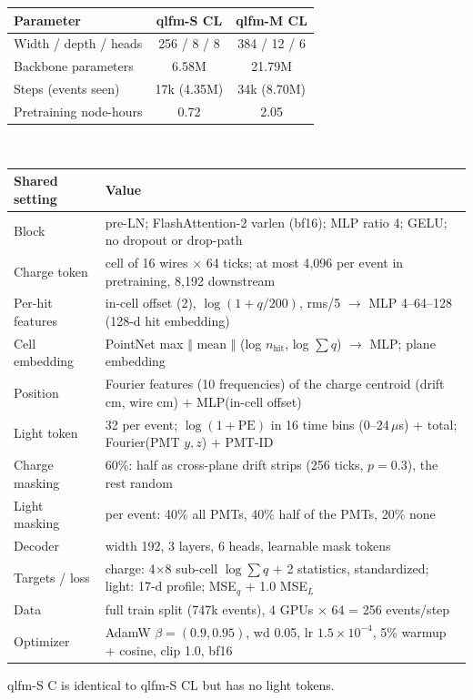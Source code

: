 \documentclass[11pt,a4paper]{article}
\begin{document}
\begin{center}\small
\begin{tabular}{lcc}
\toprule
Parameter & qlfm-S CL & qlfm-M CL\\
\midrule
Width / depth / heads & 256 / 8 / 8 & 384 / 12 / 6\\
Backbone parameters & 6.58M & 21.79M\\
Steps (events seen) & 17k (4.35M) & 34k (8.70M)\\
Pretraining node-hours & 0.72 & 2.05\\
\bottomrule
\end{tabular}\\[6pt]
\begin{tabularx}{\textwidth}{lL}
\toprule
Shared setting & Value\\
\midrule
Block & pre-LN; FlashAttention-2 varlen (bf16); MLP ratio 4; GELU; no dropout or drop-path\\
Charge token & cell of 16 wires $\times$ 64 ticks; at most 4{,}096 per event in pretraining, 8{,}192 downstream\\
Per-hit features & in-cell offset (2), $\log(1+q/200)$, rms/5 $\to$ MLP 4--64--128 (128-d hit embedding)\\
Cell embedding & PointNet max $\Vert$ mean $\Vert$ (log $n_\text{hit}$, log $\sum q$) $\to$ MLP; plane embedding\\
Position & Fourier features (10 frequencies) of the charge centroid (drift cm, wire cm) + MLP(in-cell offset)\\
Light token & 32 per event; $\log(1+\text{PE})$ in 16 time bins (0--24\,$\mu$s) + total; Fourier(PMT $y,z$) + PMT-ID\\
Charge masking & 60\%: half as cross-plane drift strips (256 ticks, $p=0.3$), the rest random\\
Light masking & per event: 40\% all PMTs, 40\% half of the PMTs, 20\% none\\
Decoder & width 192, 3 layers, 6 heads, learnable mask tokens\\
Targets / loss & charge: 4$\times$8 sub-cell $\log\sum q$ + 2 statistics, standardized; light: 17-d profile; MSE$_q$ + 1.0 MSE$_L$\\
Data & full train split (747k events), 4 GPUs $\times$ 64 = 256 events/step\\
Optimizer & AdamW $\beta=(0.9,0.95)$, wd 0.05, lr $1.5\times10^{-4}$, 5\% warmup + cosine, clip 1.0, bf16\\
\bottomrule
\end{tabularx}
\end{center}
qlfm-S C is identical to qlfm-S CL but has no light tokens.
\end{document}
